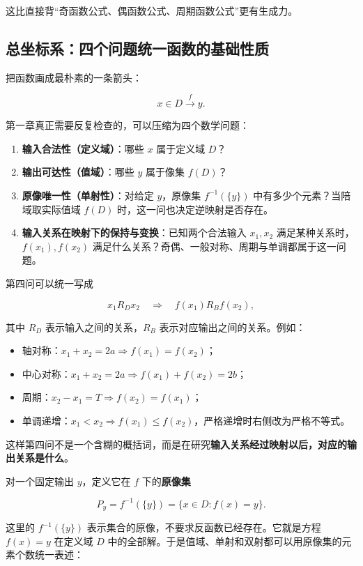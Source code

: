 \documentclass[11pt,a4paper]{ctexart}
\providecommand{\tightlist}{}
\begin{document}
这比直接背``奇函数公式、偶函数公式、周期函数公式''更有生成力。

\subsection{总坐标系：四个问题统一函数的基础性质}

把函数画成最朴素的一条箭头：

\[
x\in D\xrightarrow{\ f\ }y.
\]

第一章真正需要反复检查的，可以压缩为四个数学问题：

\begin{enumerate}
\tightlist
\item
  \textbf{输入合法性（定义域）}：哪些 \(x\) 属于定义域 \(D\)？
\item
  \textbf{输出可达性（值域）}：哪些 \(y\) 属于像集 \(f(D)\)？
\item
  \textbf{原像唯一性（单射性）}：对给定 \(y\)，原像集 \(f^{-1}(\{y\})\) 中有多少个元素？当陪域取实际值域 \(f(D)\) 时，这一问也决定逆映射是否存在。
\item
  \textbf{输入关系在映射下的保持与变换}：已知两个合法输入 \(x_1,x_2\) 满足某种关系时，\(f(x_1),f(x_2)\) 满足什么关系？奇偶、一般对称、周期与单调都属于这一问题。
\end{enumerate}

第四问可以统一写成

\[
\boxed{
x_1\mathrel{R_D}x_2
\quad\Longrightarrow\quad
f(x_1)\mathrel{R_B}f(x_2),
}
\]

其中 \(R_D\) 表示输入之间的关系，\(R_B\) 表示对应输出之间的关系。例如：

\begin{itemize}
\tightlist
\item
  轴对称：\(x_1+x_2=2a\Rightarrow f(x_1)=f(x_2)\)；
\item
  中心对称：\(x_1+x_2=2a\Rightarrow f(x_1)+f(x_2)=2b\)；
\item
  周期：\(x_2-x_1=T\Rightarrow f(x_2)=f(x_1)\)；
\item
  单调递增：\(x_1<x_2\Rightarrow f(x_1)\le f(x_2)\)，严格递增时右侧改为严格不等式。
\end{itemize}

这样第四问不是一个含糊的概括词，而是在研究\textbf{输入关系经过映射以后，对应的输出关系是什么}。

对一个固定输出 \(y\)，定义它在 \(f\) 下的\textbf{原像集}

\[
P_y=f^{-1}(\{y\})=\{x\in D:f(x)=y\}.
\]

这里的 \(f^{-1}(\{y\})\) 表示集合的原像，不要求反函数已经存在。它就是方程 \(f(x)=y\) 在定义域 \(D\) 中的全部解。于是值域、单射和双射都可以用原像集的元素个数统一表述：
\end{document}
